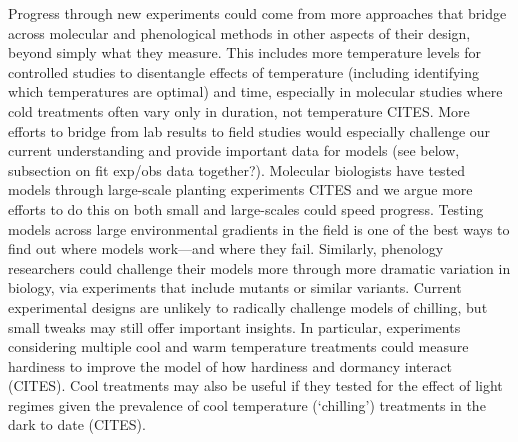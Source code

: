 \documentclass[11pt]{article}
\begin{document}
Progress through new experiments could come from more approaches that bridge across molecular and phenological methods in other aspects of their design, beyond simply what they measure. This includes more temperature levels for controlled studies to disentangle effects of temperature (including identifying which temperatures are optimal) and time, especially in molecular studies where cold treatments often vary only in duration, not temperature CITES. More efforts to bridge from lab results to field studies would especially challenge our current understanding and provide important data for models (see below, subsection on fit exp/obs data together?). Molecular biologists have tested models through large-scale planting experiments CITES and we argue more efforts to do this on both small and large-scales could speed progress. Testing models across large environmental gradients in the field is one of the best ways to find out where models work---and where they fail. Similarly, phenology researchers could challenge their models more through more dramatic variation in biology, via experiments that include mutants or similar variants. 
Current experimental designs are unlikely to radically challenge models of chilling, but small tweaks may still offer important insights. In particular, experiments considering multiple cool and warm temperature treatments could measure hardiness to improve the model of how hardiness and dormancy interact (CITES). Cool treatments may also be useful if they tested for the effect of light regimes given the prevalence of cool temperature (`chilling') treatments in the dark to date (CITES). 
\end{document}
